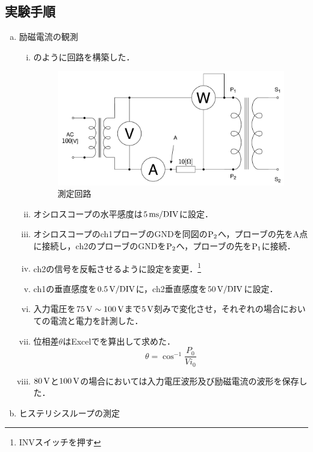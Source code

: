 \subsection{実験手順}
\begin{enumerate}[(a)]
	\item 励磁電流の観測
	\begin{enumerate}[i)]
	\item {}のように回路を構築した．
	\begin{figure}[h]
	\centering
	\includegraphics[scale=0.8]{./fig/circ.pdf}
	\caption{測定回路}
	\label{fig:circ}
	\end{figure}
	\item オシロスコープの水平感度は$5\,\rm{ms/DIV}$に設定．
	\item オシロスコープのch1プローブのGNDを同図の$\rm{P_{2}}$へ，プローブの先をA点に接続し，ch2のプローブのGNDを$\rm{P_{2}}$へ，プローブの先を$\rm{P_{1}}$に接続．
	\item ch2の信号を反転させるように設定を変更．\footnote{INVスイッチを押す}
	\item ch1の垂直感度を$0.5\,\rm{V/DIV}$に，ch2垂直感度を$50\,\rm{V/DIV}$に設定．
	\item 入力電圧を$75\,\rm{V}\sim 100\,\rm{V}$まで$5\,\rm{V}$刻みで変化させ，それぞれの場合においての電流と電力を計測した．
	\item 位相差$\theta$はExcelでを算出して求めた．
	\begin{equation}
		\theta=\cos^{-1}\frac{P_{0}}{Vi_{0}}
		\label{eq:siki}
	\end{equation}
	\item $80\,\rm{V}$と$100\,\rm{V}$の場合においては入力電圧波形及び励磁電流の波形を保存した．
\end{enumerate}
\item ヒステリシスループの測定
\begin{enumerate}[i)]

\end{enumerate}
\end{enumerate}
